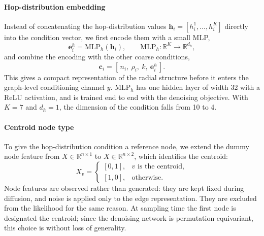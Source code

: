 


\paragraph{Hop-distribution embedding}
Instead of concatenating the hop-distribution values
$\mathbf{h}_i = [h_i^1, \dots, h_i^K]$ directly into the condition vector, we
first encode them with a small MLP,
\begin{equation}
  \mathbf{e}_i^h = \mathrm{MLP}_h(\mathbf{h}_i), \qquad
  \mathrm{MLP}_h : \mathbb{R}^K \rightarrow \mathbb{R}^{d_h},
\end{equation}
and combine the encoding with the other coarse conditions,
\begin{equation}
  \mathbf{c}_i = [\, n_i,\ \rho_i,\ k,\ \mathbf{e}_i^h \,].
\end{equation}
This gives a compact representation of the radial structure before it enters
the graph-level conditioning channel $y$. $\mathrm{MLP}_h$ has one hidden layer
of width 32 with a ReLU activation, and is trained end to end with the
denoising objective. With $K = 7$ and $d_h = 1$, the dimension of the condition
falls from 10 to 4.

\paragraph{Centroid node type}
To give the hop-distribution condition a reference node, we extend the dummy
node feature from $X \in \mathbb{R}^{n \times 1}$ to
$X \in \mathbb{R}^{n \times 2}$, which identifies the centroid:
\begin{equation}
  X_v =
  \begin{cases}
    [0, 1], & v \text{ is the centroid}, \\
    [1, 0], & \text{otherwise}.
  \end{cases}
\end{equation}
Node features are observed rather than generated: they are kept fixed during
diffusion, and noise is applied only to the edge representation. They are
excluded from the likelihood for the same reason. At sampling time the first
node is designated the centroid; since the denoising network is
permutation-equivariant, this choice is without loss of generality.


